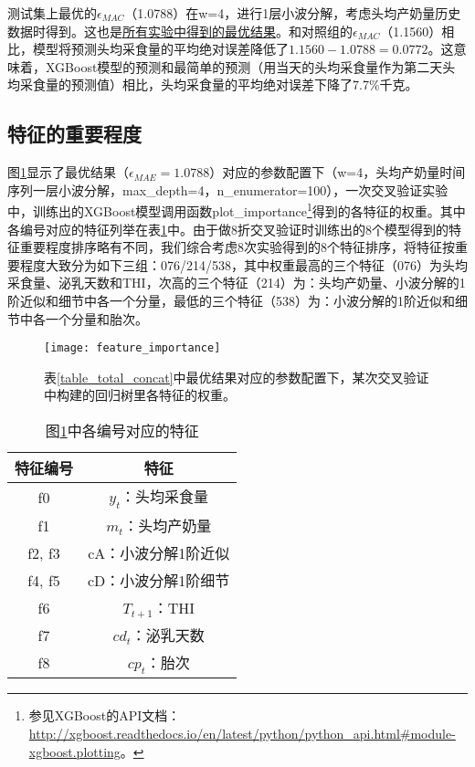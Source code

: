 测试集上最优的$\epsilon_{MAC}$（1.0788）在w=4，进行1层小波分解，考虑头均产奶量历史数据时得到。这也是\uline{所有实验中得到的最优结果}。和对照组的$\epsilon_{MAC}$（1.1560）相比，模型将预测头均采食量的平均绝对误差降低了$1.1560 - 1.0788=0.0772$。这意味着，XGBoost模型的预测和最简单的预测（用当天的头均采食量作为第二天头均采食量的预测值）相比，头均采食量的平均绝对误差下降了7.7\%千克。



\subsection{特征的重要程度}

图\ref{feature_importance}显示了最优结果（$\epsilon_{MAE} = 1.0788$）对应的参数配置下（w=4，头均产奶量时间序列一层小波分解，max\_depth=4，n\_enumerator=100），一次交叉验证实验中，训练出的XGBoost模型调用函数plot\_importance\footnote{参见XGBoost的API文档：\url{http://xgboost.readthedocs.io/en/latest/python/python\_api.html\#module-xgboost.plotting}。}得到的各特征的权重。其中各编号对应的特征列举在表\ref{feature_desc}中。由于做8折交叉验证时训练出的8个模型得到的特征重要程度排序略有不同，我们综合考虑8次实验得到的8个特征排序，将特征按重要程度大致分为如下三组：076/214/538，其中权重最高的三个特征（076）为头均采食量、泌乳天数和THI，次高的三个特征（214）为：头均产奶量、小波分解的1阶近似和细节中各一个分量，最低的三个特征（538）为：小波分解的1阶近似和细节中各一个分量和胎次。

\begin{figure}
\begin{center}
	\texttt{[image: feature\_importance]}
\caption{表\ref{table_total_concat}中最优结果对应的参数配置下，某次交叉验证中构建的回归树里各特征的权重。}
\label{feature_importance}
\end{center}
\end{figure}


\begin{table}
\caption{图\ref{feature_importance}中各编号对应的特征}
\label{feature_desc}
\footnotesize
\begin{center}
\begin{tabular}{|c|c|}
\hline
	特征编号	& 特征 \\
\hline
	f0 & $y_t$：头均采食量 \\
	f1 & $m_t$：头均产奶量\\
	f2, f3 & cA：小波分解1阶近似 \\
	f4, f5 & cD：小波分解1阶细节\\
	f6 & $T_{t+1}$：THI \\
	f7 & $cd_t$：泌乳天数 \\
	f8 & $cp_t$：胎次 \\
\hline
\end{tabular}
\end{center}
\end{table}%















